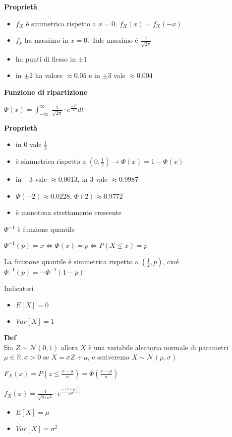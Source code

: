 \documentclass[12pt, a4paper]{article}
\begin{document}
\textbf{Proprietà}
\begin{itemize}
    \item $f_{X}$ è simmetrica rispetto a $x=0,\ f_{X}(x)=f_{X}(-x)$
    \item $f_{x}$ ha massimo in $x=0$. Tale massimo è $\frac{1}{\sqrt{2\pi}}$
    \item ha punti di flesso in $\pm 1$
    \item in $\pm 2$ ha valore $\approx 0.05$ e in $\pm 3$ vale $\approx 0.004$
\end{itemize}

\textbf{Funzione di ripartizione}
\begin{center}
    $\Phi(x)=\int_{-\infty}^{\infty}\ \frac{1}{\sqrt{2\pi}}\cdot e^{\frac{-x^{2}}{2}} dt$ 
\end{center}

\textbf{Proprietà}
\begin{itemize}
    \item in $0$ vale $\frac{1}{2}$
    \item è simmetrica rispetto a $(0,\frac{1}{2})\rightarrow \Phi(x)=1-\Phi(x)$
    \item in $-3$ vale $\approx 0.0013$, in $3$ vale $\approx 0.9987$
    \item $\Phi(-2)\approx 0.0228$, $\Phi(2)\approx 0.9772$
    \item è monotona strettamente crescente
\end{itemize}

$\Phi^{-1}$ è funzione quantile
\begin{center}
    $\Phi^{-1}(p)=x\Leftrightarrow\Phi(x)=p\Leftrightarrow P(X\leq x)=p$
\end{center}
La funzione quantile è simmetrica rispetto a $(\frac{1}{2},p)$, cioé $\Phi^{-1}(p)=-\Phi^{-1}(1-p)$

Indicatori
\begin{itemize}
    \item $E[X]=0$
    \item $Var[X]=1$
\end{itemize}

\textbf{Def}\\ Sia $Z\sim\mathcal{N}(0,1)$ allora $X$ è una variabile aleatoria normale di parametri
$\mu\in\mathbb{R},\sigma>0$ se $X=\sigma Z+\mu$, e scriveremo $X\sim\mathcal{N}(\mu,\sigma)$
\begin{center}
    $F_{X}(x)=P(z\leq \frac{x-\mu}{\sigma})=\Phi(\frac{x-\mu}{\sigma})$

    $f_{X}(x)=\frac{1}{\sqrt{2\pi\sigma^{2}}}\cdot e^{\frac{-(x-\mu)^{2}}{2\sigma^{2}}}$
\end{center}
\begin{itemize}
    \item $E[X]=\mu$
    \item $Var[X]=\sigma^{2}$
\end{itemize}
\end{document}
